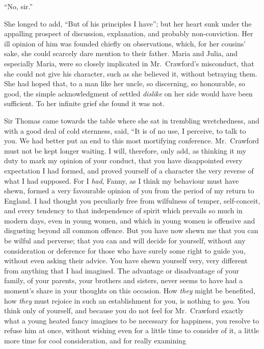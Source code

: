 \documentclass{article}
\begin{document}
``No, sir.''

She longed to add, ``But of his principles I have''; but her
heart sunk under the appalling prospect of discussion,
explanation, and probably non-conviction. Her ill opinion
of him was founded chiefly on observations, which,
for her cousins' sake, she could scarcely dare mention
to their father.  Maria and Julia, and especially Maria,
were so closely implicated in Mr.\ Crawford's misconduct,
that she could not give his character, such as she
believed it, without betraying them.  She had hoped that,
to a man like her uncle, so discerning, so honourable,
so good, the simple acknowledgment of settled \emph{dislike}
on her side would have been sufficient.  To her infinite
grief she found it was not.

Sir Thomas came towards the table where she sat
in trembling wretchedness, and with a good deal of
cold sternness, said, ``It is of no use, I perceive,
to talk to you.  We had better put an end to this
most mortifying conference.  Mr.\ Crawford must not be
kept longer waiting.  I will, therefore, only add,
as thinking it my duty to mark my opinion of your conduct,
that you have disappointed every expectation I had formed,
and proved yourself of a character the very reverse
of what I had supposed.  For I \emph{had}, Fanny, as I think
my behaviour must have shewn, formed a very favourable
opinion of you from the period of my return to England.
I had thought you peculiarly free from wilfulness of temper,
self-conceit, and every tendency to that independence
of spirit which prevails so much in modern days,
even in young women, and which in young women is offensive
and disgusting beyond all common offence.  But you
have now shewn me that you can be wilful and perverse;
that you can and will decide for yourself, without any
consideration or deference for those who have surely some
right to guide you, without even asking their advice.
You have shewn yourself very, very different from anything
that I had imagined.  The advantage or disadvantage of
your family, of your parents, your brothers and sisters,
never seems to have had a moment's share in your thoughts
on this occasion.  How \emph{they} might be benefited,
how \emph{they} must rejoice in such an establishment for you,
is nothing to \emph{you}.  You think only of yourself,
and because you do not feel for Mr.\ Crawford exactly what a
young heated fancy imagines to be necessary for happiness,
you resolve to refuse him at once, without wishing
even for a little time to consider of it, a little more
time for cool consideration, and for really examining
\end{document}
